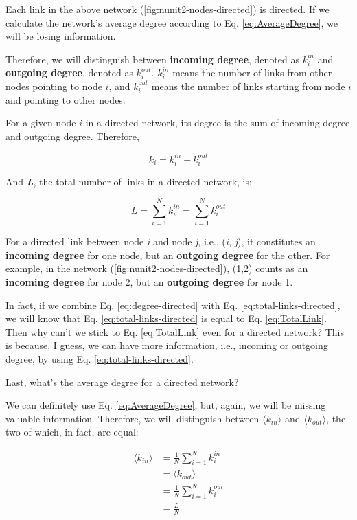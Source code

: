\documentclass[
]{krantz}
\begin{document}
Each link in the above network (\ref{fig:nunit2-nodes-directed}) is directed. If we calculate the network's average degree according to Eq. \eqref{eq:AverageDegree}, we will be losing information.

Therefore, we will distinguish between \textbf{incoming degree}, denoted as \(k_i^{in}\) and \textbf{outgoing degree}, denoted as \(k_i^{out}\). \(k_i^{in}\) means the number of links from other nodes pointing to node \(i\), and \(k_i^{out}\) means the number of links starting from node \(i\) and pointing to other nodes.

For a given node \(i\) in a directed network, its degree is the sum of incoming degree and outgoing degree. Therefore,

\begin{equation} 
  k_i = k_i^{in} + k_i^{out} \label{eq:degree-directed}
\end{equation}

And \textbf{\emph{L}}, the total number of links in a directed network, is:

\begin{equation}
  L = \sum_{i=1}^N k_i^{in} = \sum_{i=1}^N k_i^{out} \label{eq:total-links-directed}
\end{equation}

For a directed link between node \emph{i} and node \emph{j}, i.e., (\emph{i}, \emph{j}), it constitutes an \textbf{incoming degree} for one node, but an \textbf{outgoing degree} for the other. For example, in the network (\ref{fig:nunit2-nodes-directed}), (1,2) counts as an \textbf{incoming degree} for node 2, but an \textbf{outgoing degree} for node 1.

In fact, if we combine Eq. \eqref{eq:degree-directed} with Eq. \eqref{eq:total-links-directed}, we will know that Eq. \eqref{eq:total-links-directed} is equal to Eq. \eqref{eq:TotalLink}. Then why can't we stick to Eq. \eqref{eq:TotalLink} even for a directed network? This is because, I guess, we can have more information, i.e., incoming or outgoing degree, by using Eq. \eqref{eq:total-links-directed}.

Last, what's the average degree for a directed network?

We can definitely use Eq. \eqref{eq:AverageDegree}, but, again, we will be missing valuable information. Therefore, we will distinguish between \(\langle k_{in} \rangle\) and \(\langle k_{out} \rangle\), the two of which, in fact, are equal:

\begin{equation}
\begin{split}
  \langle k_{in} \rangle & = \frac{1}{N}\sum_{i=1}^N k_i^{in}\\
  & = \langle k_{out} \rangle\\
  & = \frac{1}{N}\sum_{i=1}^N k_i^{out}\\
  & = \frac{L}{N} 
\end{split}
\label{eq:average-degree-directed}
\end{equation}
\end{document}
